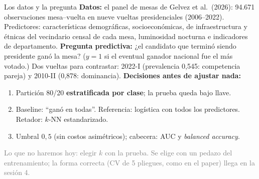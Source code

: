 \documentclass{beamer}
\newcommand{\1}{\mathbb{I}}
\begin{document}
\begin{frame}{Los datos y la pregunta}
\small
\textbf{Datos:} el panel de mesas de Gelvez et al.\ (2026): 94.671 observaciones mesa--vuelta en nueve vueltas presidenciales (2006--2022). Predictores: características demográficas, socioeconómicas, de infraestructura y étnicas del vecindario censal de cada mesa, luminosidad nocturna e indicadores de departamento.
\pause
\vspace{0.05cm}
\textbf{Pregunta predictiva:} ¿el candidato que terminó siendo presidente ganó la mesa? ($y = 1$ si el eventual ganador nacional fue el más votado.) Dos vueltas para contrastar: 2022-I (prevalencia 0,545: competencia pareja) y 2010-II (0,878: dominancia).
\pause
\vspace{0.05cm}
\textbf{Decisiones antes de ajustar nada:}
\begin{enumerate}\itemsep2pt
  \item Partición 80/20 \textbf{estratificada por clase}; la prueba queda bajo llave.
  \item Baseline: ``ganó en todas''. Referencia: logística con todos los predictores. Retador: $k$-NN estandarizado.
  \item Umbral $0{,}5$ (sin costos asimétricos); cabecera: AUC y \emph{balanced accuracy}.
\end{enumerate}
\pause
\textcolor{gray}{Lo que no haremos hoy: elegir $k$ con la prueba. Se elige con un pedazo del entrenamiento; la forma correcta (CV de 5 pliegues, como en el paper) llega en la sesión 4.}
\end{frame}
\end{document}
